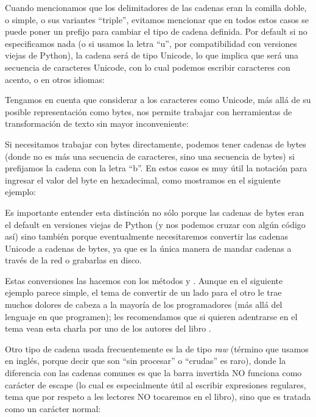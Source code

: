 
Cuando mencionamos que los delimitadores de las cadenas eran la comilla doble, o simple, o sus variantes ``triple'', evitamos mencionar que en todos estos casos se puede poner un prefijo para cambiar el tipo de cadena definida. Por default si no especificamos nada (o si usamos la letra ``u'', por compatibilidad con versiones viejas de Python), la cadena será de tipo Unicode, lo que implica que será una secuencia de caracteres Unicode, con lo cual podemos escribir caracteres con acento, o en otros idiomas:


Tengamos en cuenta que considerar a los caracteres como Unicode, más allá de su posible representación como bytes, nos permite trabajar con herramientas de transformación de texto sin mayor inconveniente:


Si necesitamos trabajar con bytes directamente, podemos tener cadenas de bytes (donde no es más una secuencia de caracteres, sino una secuencia de bytes) si prefijamos la cadena con la letra ``b''. En estos casos es muy útil la notación \mip{\x} para ingresar el valor del byte en hexadecimal, como mostramos en el siguiente ejemplo:


Es importante entender esta distinción no sólo porque las cadenas de bytes eran el default en versiones viejas de Python (y nos podemos cruzar con algún código así) sino también porque eventualmente necesitaremos convertir las cadenas Unicode a cadenas de bytes, ya que es la única manera de mandar cadenas a través de la red o grabarlas en disco.

Estas conversiones las hacemos con los métodos  y . Aunque en el siguiente ejemplo parece simple, el tema de convertir de un lado para el otro le trae muchos dolores de cabeza a la mayoría de los programadores (más allá del lenguaje en que programen); les recomendamos que si quieren adentrarse en el tema vean esta charla por uno de los autores del libro \cite{entendiendo_unicode}.


Otro tipo de cadena usada frecuentemente es la de tipo \textit{raw} (término que usamos en inglés, porque decir que son ``sin procesar'' o ``crudas'' es raro), donde la diferencia con las cadenas comunes es que la barra invertida NO funciona como carácter de escape (lo cual es especialmente útil al escribir expresiones regulares, tema que por respeto a les lectores NO tocaremos en el libro), sino que es tratada como un carácter normal:

